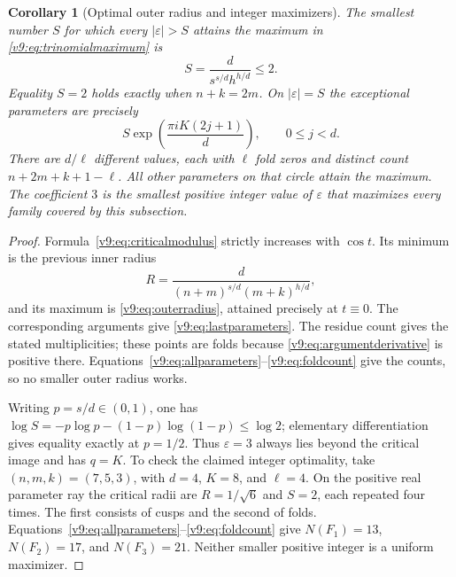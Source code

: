 \documentclass[UTF8,11pt]{ctexart}
\newtheorem{cor}[thm]{Corollary}
\theoremstyle{definition}
\numberwithin{equation}{section}
\begin{document}
\begin{cor}[Optimal outer radius and integer maximizers]
\label{v9:cor:outerradius}
The smallest number $S$ for which every $|\varepsilon|>S$ attains
the maximum in \eqref{v9:eq:trinomialmaximum} is
\begin{equation}\label{v9:eq:outerradius}
 S=\frac{d}{s^{s/d}h^{h/d}}\le2.
\end{equation}
Equality $S=2$ holds exactly when $n+k=2m$.
On $|\varepsilon|=S$ the exceptional parameters are precisely
\begin{equation}\label{v9:eq:lastparameters}
 S\exp\left(\frac{\pi iK(2j+1)}d\right),\qquad 0\le j<d.
\end{equation}
There are $d/\ell$ different values, each with $\ell$ fold zeros
and distinct count $n+2m+k+1-\ell$. All other parameters on
that circle attain the maximum. The coefficient $3$ is the
smallest positive integer value of $\varepsilon$ that maximizes
every family covered by this subsection.
\end{cor}
\begin{proof}
Formula~\eqref{v9:eq:criticalmodulus} strictly increases with
$\cos t$. Its minimum is the previous inner radius
\[
 R=\frac{d}{(n+m)^{s/d}(m+k)^{h/d}},
\]
and its maximum is \eqref{v9:eq:outerradius}, attained precisely
at $t\equiv0$. The corresponding arguments give
\eqref{v9:eq:lastparameters}. The residue count gives the stated
multiplicities; these points are folds because
\eqref{v9:eq:argumentderivative} is positive there.
Equations~\eqref{v9:eq:allparameters}--\eqref{v9:eq:foldcount}
give the counts, so no smaller outer radius works.

Writing $p=s/d\in(0,1)$, one has
$\log S=-p\log p-(1-p)\log(1-p)\le\log2$;
elementary differentiation gives equality exactly at $p=1/2$.
Thus $\varepsilon=3$ always lies beyond the critical image and
has $q=K$. To check the claimed integer optimality, take
$(n,m,k)=(7,5,3)$, with $d=4$, $K=8$, and $\ell=4$.
On the positive real parameter ray the critical radii are
$R=1/\sqrt6$ and $S=2$, each repeated four times.
The first consists of cusps and the second of folds.
Equations~\eqref{v9:eq:allparameters}--\eqref{v9:eq:foldcount}
give $N(F_1)=13$, $N(F_2)=17$, and $N(F_3)=21$.
Neither smaller positive integer is a uniform maximizer.
\end{proof}
\end{document}
